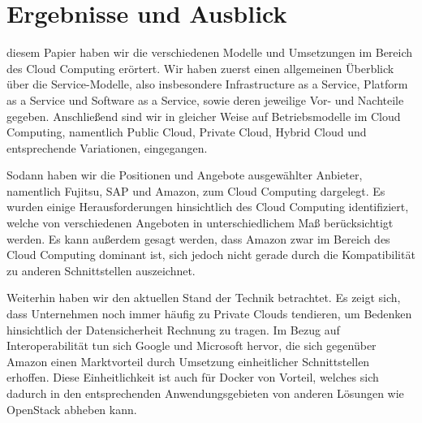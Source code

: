 \section{Ergebnisse und Ausblick}
\label{sec_conclusion}

 diesem Papier haben wir die verschiedenen Modelle und Umsetzungen im Bereich des Cloud Computing erörtert. 
Wir haben zuerst einen allgemeinen Überblick über die Service-Modelle, also insbesondere Infrastructure as a Service, Platform as a Service und Software as a Service, sowie deren jeweilige Vor- und Nachteile gegeben. 
Anschließend sind wir in gleicher Weise auf Betriebsmodelle im Cloud Computing, namentlich Public Cloud, Private Cloud, Hybrid Cloud und entsprechende Variationen, eingegangen. 


Sodann haben wir die Positionen und Angebote ausgewählter Anbieter, namentlich Fujitsu, SAP und Amazon, zum Cloud Computing dargelegt. 
Es wurden einige Herausforderungen hinsichtlich des Cloud Computing identifiziert, welche von verschiedenen Angeboten in unterschiedlichem Maß berücksichtigt werden.
Es kann außerdem gesagt werden, dass Amazon zwar im Bereich des Cloud Computing dominant ist, sich jedoch nicht gerade durch die Kompatibilität zu anderen Schnittstellen auszeichnet.


Weiterhin haben wir den aktuellen Stand der Technik betrachtet.
Es zeigt sich, dass Unternehmen noch immer häufig zu Private Clouds tendieren, um Bedenken hinsichtlich der Datensicherheit Rechnung zu tragen. 
Im Bezug auf Interoperabilität tun sich Google und Microsoft hervor, die sich gegenüber Amazon einen Marktvorteil durch Umsetzung einheitlicher Schnittstellen erhoffen. 
Diese Einheitlichkeit ist auch für Docker von Vorteil, welches sich dadurch in den entsprechenden Anwendungsgebieten von anderen Lösungen wie OpenStack abheben kann. 


